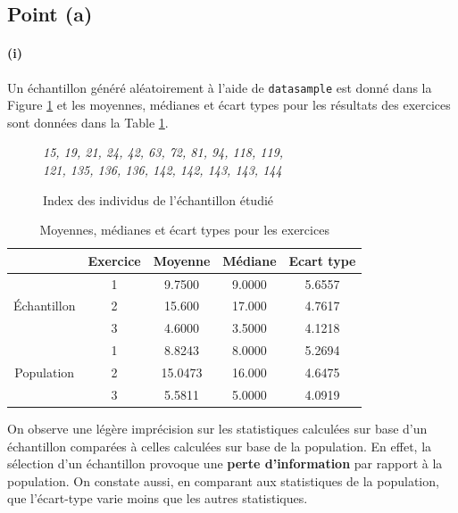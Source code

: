 \documentclass[a4paper,11pt]{article}
\begin{document}
\subsection{Point (a)}
\paragraph{(i)} Un échantillon généré aléatoirement à l'aide de \texttt{datasample} est donné dans la Figure \ref{fig:sample1} et les moyennes, médianes et écart types pour les résultats des exercices sont données dans la Table \ref{tab:q2ai_stat1sample}.

\begin{figure}[!h]
	\center
	\textit{15, 19, 21, 24, 42, 63, 72, 81, 94, 118, 119,}\\
 	\textit{121, 135, 136, 136, 142, 142, 143, 143, 144}
	\caption{Index des individus de l'échantillon étudié}
	\label{fig:sample1}
\end{figure}

%
\begin{table}[!h]
	\center
	\begin{tabular}{|c|c|ccc|}
		\hline
		& Exercice & \textbf{Moyenne} & \textbf{Médiane} & \textbf{Ecart type}\\
		\hline
		\multirow{3}{*}{\begin{sideways}\parbox{13.5mm}{\tiny Échantillon}\end{sideways}} & 1 & 9.7500 & 9.0000 & 5.6557\\
		& 2 & 15.600 & 17.000 & 4.7617 \\
		& 3 & 4.6000 & 3.5000 & 4.1218 \\
		\hline
		\multirow{3}{*}{\begin{sideways}\parbox{13.5mm}{\tiny Population}\end{sideways}} & 1 & 8.8243 & 8.0000 & 5.2694\\
		& 2 & 15.0473 & 16.000 & 4.6475\\
		& 3 & 5.5811 & 5.0000 & 4.0919\\
		\hline
	\end{tabular}
	\caption{Moyennes, médianes et écart types pour les exercices}
	\label{tab:q2ai_stat1sample}
\end{table}
%
On observe une légère imprécision sur les statistiques calculées sur base d'un échantillon comparées à celles calculées sur base de la population. En effet, la sélection d'un échantillon provoque une \textbf{perte d'information} par rapport à la population. On constate aussi, en comparant aux statistiques de la population, que l'écart-type varie moins que les autres statistiques. 
\end{document}
